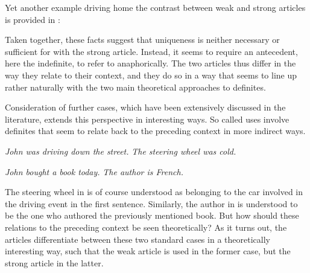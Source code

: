 \documentclass[output=paper
,modfonts
,nonflat]{langscibook}
\begin{document}
Yet another example driving
home the contrast between weak and strong articles is provided in :


Taken together, these facts suggest that uniqueness is neither
necessary or sufficient for  with the strong
article. Instead, it seems to require an antecedent, here the
indefinite, to refer to anaphorically. The two articles thus differ in
the way they relate to their context, and they do so in a way that
seems to line up rather naturally with the two main theoretical approaches
to definites. 

Consideration of further cases, which have been extensively discussed
in the literature, extends this perspective in interesting ways. So
called  uses \citep{Clark1975,Hawkins1978,Prince1981} involve
definites that seem to relate back to the preceding context in more
indirect ways. \newpage

\begin{exe}
\ex\label{ex:schwarz:9}
\begin{xlist}
\ex \textit{John was driving down the street.} 
\ex \textit{The steering wheel was cold.}
\end{xlist}
\ex\label{ex:schwarz:10}
\begin{xlist}
\ex \textit{John bought a book today.} 
\ex \textit{The author is French.}
\end{xlist}
\end{exe}

The steering wheel in  is of course understood as
belonging to the car involved in the driving event in the first
sentence. Similarly, the author in  is understood to
be the one who authored the previously mentioned book. But how should
these relations to the preceding context be seen theoretically? As it turns out, the  articles differentiate between these two
standard cases in a theoretically interesting way, such that the weak article is used in the former case,
but the strong article in the latter.
\end{document}
